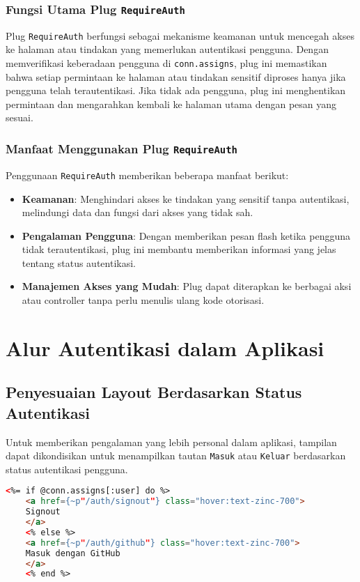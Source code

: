 \subsubsection{Fungsi Utama Plug \texttt{RequireAuth}}
Plug \texttt{RequireAuth} berfungsi sebagai mekanisme keamanan untuk mencegah akses ke halaman atau tindakan yang memerlukan autentikasi pengguna. Dengan memverifikasi keberadaan pengguna di \texttt{conn.assigns}, plug ini memastikan bahwa setiap permintaan ke halaman atau tindakan sensitif diproses hanya jika pengguna telah terautentikasi. Jika tidak ada pengguna, plug ini menghentikan permintaan dan mengarahkan kembali ke halaman utama dengan pesan yang sesuai.

\subsubsection{Manfaat Menggunakan Plug \texttt{RequireAuth}}
Penggunaan \texttt{RequireAuth} memberikan beberapa manfaat berikut:
\begin{itemize}
	\item \textbf{Keamanan}: Menghindari akses ke tindakan yang sensitif tanpa autentikasi, melindungi data dan fungsi dari akses yang tidak sah.
	\item \textbf{Pengalaman Pengguna}: Dengan memberikan pesan flash ketika pengguna tidak terautentikasi, plug ini membantu memberikan informasi yang jelas tentang status autentikasi.
	\item \textbf{Manajemen Akses yang Mudah}: Plug dapat diterapkan ke berbagai aksi atau controller tanpa perlu menulis ulang kode otorisasi.
\end{itemize}


\section{Alur Autentikasi dalam Aplikasi}

\subsection{Penyesuaian Layout Berdasarkan Status Autentikasi}
Untuk memberikan pengalaman yang lebih personal dalam aplikasi, tampilan dapat dikondisikan untuk menampilkan tautan \texttt{Masuk} atau \texttt{Keluar} berdasarkan status autentikasi pengguna.

\begin{lstlisting}[language=html, caption={\texttt{lib/hello\_web/components/layouts/app.html.heex}}]
	<%= if @conn.assigns[:user] do %>
	<a href={~p"/auth/signout"} class="hover:text-zinc-700">
	Signout
	</a> 
	<% else %>
	<a href={~p"/auth/github"} class="hover:text-zinc-700">
	Masuk dengan GitHub
	</a>
	<% end %>
\end{lstlisting}

